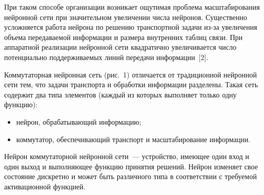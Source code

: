 \begin{multicols}{2}
     При таком способе организации возникает ощутимая проблема 
масштабирования нейронной сети при значительном увеличении числа 
нейронов. Существенно усложняется работа нейрона по решению 
транспортной задачи из-за увеличения объема передаваемой информации и 
размера внутренних таблиц связи. При аппаратной реализации нейронной 
сети квадратично увеличивается число потенциально поддерживаемых линий 
передачи информации~[2].
     
     Коммутаторная нейронная сеть (рис.~1) отличается от традиционной нейронной 
сети тем, что задачи транспорта и обработки информации разделены. Такая 
сеть содержит два типа элементов (каждый из которых выполняет только 
одну функцию):
     \begin{itemize}
     \item
нейрон, обрабатывающий информацию;
\item коммутатор, обеспечивающий транспорт и масштабирование 
информации.
\end{itemize}

   

     Нейрон коммутаторной нейронной сети~--- устройство, имеющее один 
вход и один выход и выполняющее функцию принятия решений. Нейрон 
изменяет свое состояние дискретно и может
 быть различного типа в 
соответствии с требуемой активационной функцией.
\pagebreak
\end{multicols}

\begin{figure} %
\vspace*{1pt}
\begin{center}
\mbox{%
\epsfxsize=164.361mm
}
\end{center}
\vspace*{-3pt}
\vspace*{14pt}
\end{figure}

